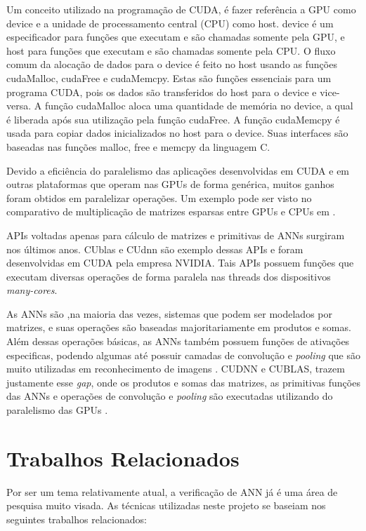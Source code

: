 Um conceito utilizado na programação de CUDA, é fazer referência a GPU como device e a unidade de processamento central (CPU) como host.     device é um especificador para funções que executam e são chamadas somente pela GPU, e host para funções que executam e são chamadas somente pela CPU. O fluxo comum da alocação de dados para o device é feito no host usando as funções cudaMalloc, cudaFree e cudaMemcpy. Estas são funções essenciais para um programa CUDA, pois os dados são transferidos do host para o device e vice-versa. A função cudaMalloc aloca uma quantidade de memória no device, a qual é liberada após sua utilização pela função cudaFree. A função cudaMemcpy é usada para copiar dados inicializados no host para o device. Suas interfaces são baseadas nas funções malloc, free e memcpy da linguagem C.

Devido a eficiência do paralelismo das aplicações desenvolvidas em CUDA e em outras plataformas que operam nas GPUs de forma genérica, muitos ganhos foram obtidos em paralelizar operações. Um exemplo pode ser visto no comparativo de multiplicação de matrizes esparsas entre GPUs e CPUs em \cite{liang2017}.

APIs voltadas apenas para cálculo de matrizes e primitivas de ANNs surgiram nos últimos anos. CUblas e CUdnn são exemplo dessas APIs e foram desenvolvidas em CUDA pela empresa NVIDIA. Tais APIs possuem funções que executam diversas operações de forma paralela nas threads dos dispositivos \textit{many-cores}.

As ANNs são ,na maioria das vezes, sistemas que podem ser modelados por matrizes, e suas operações são baseadas majoritariamente em produtos e somas. Além dessas operações básicas, as ANNs também possuem funções de ativações especificas, podendo algumas até possuir camadas de convolução e \textit{pooling} que são muito utilizadas em reconhecimento de imagens \cite{Kim2017}. CUDNN e CUBLAS, trazem justamente esse \textit{gap}, onde os produtos e somas das matrizes, as primitivas funções das ANNs e operações de convolução e \textit{pooling} são executadas utilizando do paralelismo das GPUs \cite{wang2015}. 

\section{Trabalhos Relacionados}

Por ser um tema relativamente atual, a verificação de ANN já é uma área de pesquisa muito visada. As técnicas utilizadas neste projeto se baseiam nos seguintes trabalhos relacionados:


